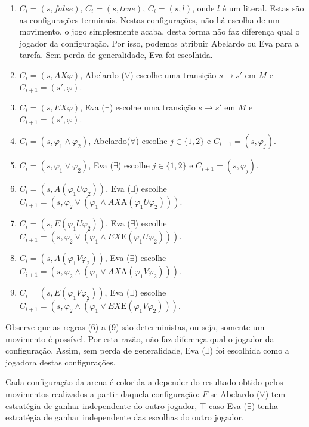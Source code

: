 \documentclass[normaltoc,capchap,capsec,times]{abnt}
\begin{document}
\begin{enumerate}[label=(\arabic*),noitemsep]
\item $C_i = (s,false)$, $C_i = (s,true)$, $C_i = (s,l)$, onde $l$ é um literal.  Estas são as configurações terminais. Nestas configurações, não há escolha de um movimento, o jogo simplesmente acaba, desta forma não faz diferença qual o jogador da configuração. Por isso, podemos atribuir Abelardo ou Eva para a tarefa. Sem perda de generalidade,  Eva foi escolhida.
\item $C_i = (s,AX\varphi)$, Abelardo ($\forall$) escolhe uma transição $s \to s'$ em $M$ e $C_{i+1}=(s',\varphi)$.
\item $C_i = (s,EX\varphi)$, Eva ($\exists$) escolhe uma transição $s \to s'$ em $M$ e $C_{i+1}=(s',\varphi)$.
\item $C_i = (s,\varphi_1 \wedge \varphi_2)$, Abelardo($\forall$) escolhe $j \in \{ 1,2\}$ e $C_{i+1}=(s,\varphi_j)$.
\item $C_i = (s,\varphi_1 \vee \varphi_2)$, Eva ($\exists$) escolhe $j \in \{ 1,2\}$ e $C_{i+1}=(s,\varphi_j)$.
\item $C_i = (s, A(\varphi_1 U \varphi_2))$, Eva ($\exists$) escolhe $C_{i+1}=(s,\varphi_2 \vee (\varphi_1 \wedge AX \mbox{A}(\varphi_1 U \varphi_2)))$.
\item $C_i = (s, E(\varphi_1 U \varphi_2))$, Eva ($\exists$) escolhe $C_{i+1}=(s,\varphi_2 \vee (\varphi_1 \wedge EX \mbox{E}(\varphi_1 U \varphi_2)))$.
\item $C_i = (s, A(\varphi_1 V \varphi_2))$, Eva ($\exists$) escolhe $C_{i+1}=(s,\varphi_2 \wedge (\varphi_1 \vee AX \mbox{A}(\varphi_1 V \varphi_2)))$.
\item $C_i = (s, E(\varphi_1 V \varphi_2))$, Eva ($\exists$) escolhe $C_{i+1}=(s,\varphi_2 \wedge (\varphi_1 \vee EX \mbox{E}(\varphi_1 V \varphi_2)))$.
\end{enumerate}

Observe que as regras (6) a (9) são deterministas, ou seja, somente um movimento é possível. Por esta razão, não faz diferença qual o jogador da configuração. Assim, sem perda de generalidade, Eva ($\exists$) foi escolhida como a jogadora destas configurações. 


Cada configuração da arena é colorida a depender do resultado obtido pelos movimentos realizados a partir daquela configuração: $F$ se Abelardo ($\forall$) tem estratégia de ganhar independente do outro jogador, $\top$ caso Eva ($\exists$) tenha estratégia de ganhar independente das escolhas do outro jogador.
\end{document}
